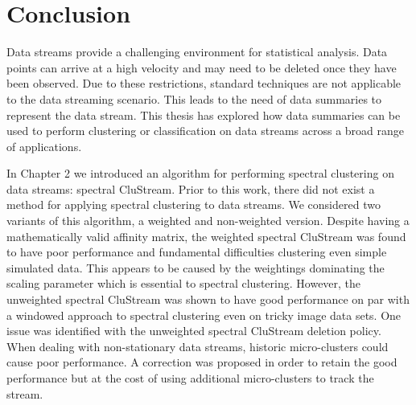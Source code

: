 

\chapter{Conclusion}
\label{chap:conc}

Data streams  provide a challenging environment for statistical analysis. Data points can arrive at a high velocity and may need to be deleted once they have been observed. Due to these restrictions, standard techniques are not applicable to the data streaming scenario. This leads to the need of data summaries to represent the data stream. This thesis has explored how data summaries can be used to perform clustering or classification on data streams across a broad range of applications.


In Chapter 2 we introduced an algorithm for performing spectral clustering on data streams: spectral CluStream. Prior to this work, there did not exist a method for applying spectral clustering to data streams. We considered two variants of this algorithm, a weighted and non-weighted version. Despite having a mathematically valid affinity matrix, the weighted spectral CluStream was found to have poor performance and fundamental difficulties clustering even simple simulated data. This appears to be caused by the weightings dominating the scaling parameter which is essential to spectral clustering. However, the unweighted spectral CluStream was shown to have good performance on par with a windowed approach to spectral clustering even on tricky image data sets. One issue was identified with the unweighted spectral CluStream deletion policy. When dealing with non-stationary data streams, historic micro-clusters could cause poor performance. A correction was proposed in order to retain the good performance but at the cost of using additional micro-clusters to track the stream.

